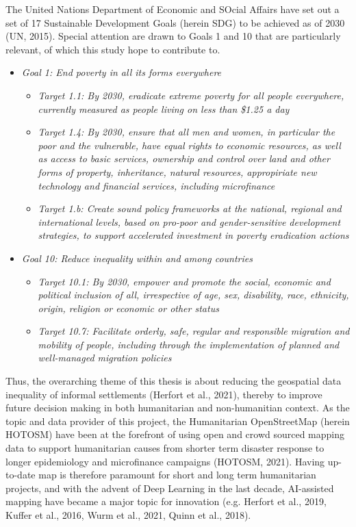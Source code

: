 \documentclass[11pt, a4paper, twoside]{report}
\begin{document}
The United Nations Department of Economic and SOcial Affairs have set out a set of 17 Sustainable Development Goals (herein SDG) to be achieved as of 2030 (UN, 2015). Special attention are drawn to Goals 1 and 10 that are particularly relevant, of which this study hope to contribute to.\\\par

\begin{itemize}
  \item{\textit{Goal 1: End poverty in all its forms everywhere}}
  \begin{itemize}
    \item{\textit{Target 1.1: By 2030, eradicate extreme poverty for all people everywhere, currently measured as people living on less than \$1.25 a day}}
    \item{\textit{Target 1.4: By 2030, ensure that all men and women, in particular the poor and the vulnerable, have equal rights to economic resources, as well as access to basic services, ownership and control over land and other forms of property, inheritance, natural resources, appropiriate new technology and financial services, including microfinance}}
    \item{\textit{Target 1.b: Create sound policy frameworks at the national, regional and international levels, based on pro-poor and gender-sensitive development strategies, to support accelerated investment in poverty eradication actions}}
  \end{itemize}
  \item{\textit{Goal 10: Reduce inequality within and among countries}}
  \begin{itemize}
    \item{\textit{Target 10.1: By 2030, empower and promote the social, economic and political inclusion of all, irrespective of age, sex, disability, race, ethnicity, origin, religion or economic or other status}}
    \item{\textit{Target 10.7: Facilitate orderly, safe, regular and responsible migration and mobility of people, including through the implementation of planned and well-managed migration policies}}
  \end{itemize}
\end{itemize}
\newline

Thus, the overarching theme of this thesis is about reducing the geospatial data inequality of informal settlements (Herfort et al., 2021), thereby to improve future decision making in both humanitarian and non-humanitian context. As the topic and data provider of this project, the Humanitarian OpenStreetMap (herein HOTOSM) have been at the forefront of using open and crowd sourced mapping data to support humanitarian causes from shorter term disaster response to longer epidemiology and microfinance campaigns (HOTOSM, 2021). Having up-to-date map is therefore paramount for short and long term humanitarian projects, and with the advent of Deep Learning in the last decade, AI-assisted mapping have became a major topic for innovation (e.g. Herfort et al., 2019, Kuffer et al., 2016, Wurm et al., 2021, Quinn et al., 2018).
\end{document}
